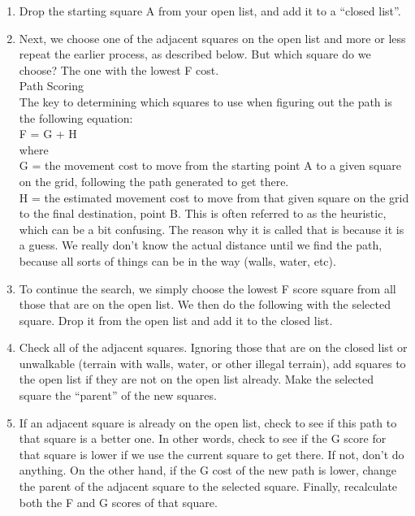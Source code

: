 \documentclass[twocolumn]{IEEEtran}
\begin{document}
\begin{enumerate}
\begin{enumerate}
    \item Drop the starting square A from your open list, and add it to a “closed list”.
    
    \item Next, we choose one of the adjacent squares on the open list and more or less repeat the earlier process, as described below. But which square do we choose? The one with the lowest F cost.\\

Path Scoring\\

The key to determining which squares to use when figuring out the path is the following equation:\\

F = G + H \\

where\\

G = the movement cost to move from the starting point A to a given square on the grid, following the path generated to get there.\\ 
H = the estimated movement cost to move from that given square on the grid to the final destination, point B. This is often referred to as the heuristic, which can be a bit confusing. The reason why it is called that is because it is a guess. We really don’t know the actual distance until we find the path, because all sorts of things can be in the way (walls, water, etc). 

	\item To continue the search, we simply choose the lowest F score square from all those that are on the open list. We then do the following with the selected square. Drop it from the open list and add it to the closed list.
    
    \item Check all of the adjacent squares. Ignoring those that are on the closed list or unwalkable (terrain with walls, water, or other illegal terrain), add squares to the open list if they are not on the open list already. Make the selected square the “parent” of the new squares.
    
    \item If an adjacent square is already on the open list, check to see if this path to that square is a better one. In other words, check to see if the G score for that square is lower if we use the current square to get there. If not, don’t do anything. 
    On the other hand, if the G cost of the new path is lower, change the parent of the adjacent square to the selected square. Finally, recalculate both the F and G scores of that square.\\


\end{enumerate}
\end{enumerate}
\end{document}

